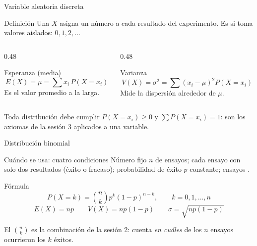 \documentclass[aspectratio=169,10pt]{beamer}
\begin{document}
\begin{frame}{Variable aleatoria discreta}
  \begin{block}{Definición}
    \small
    Una  $X$ asigna un número a cada resultado del
    experimento. Es  si toma valores aislados: $0,1,2,\dots$
  \end{block}

  \vspace{0.2cm}
  \begin{columns}[T,onlytextwidth]
    \begin{column}{0.48\textwidth}
      \begin{exampleblock}{Esperanza (media)}
        \[ E(X)=\mu=\sum x_i\,P(X=x_i) \]
        \footnotesize Es el valor promedio a la larga.
      \end{exampleblock}
    \end{column}
    \begin{column}{0.48\textwidth}
      \begin{exampleblock}{Varianza}
        \[ V(X)=\sigma^{2}=\sum (x_i-\mu)^{2}P(X=x_i) \]
        \footnotesize Mide la dispersión alrededor de $\mu$.
      \end{exampleblock}
    \end{column}
  \end{columns}

  \vspace{0.25cm}
  {\footnotesize\color{uniGris} Toda distribución debe cumplir
  $P(X=x_i)\ge 0$ y $\sum P(X=x_i)=1$: son los axiomas de la sesión 3
  aplicados a una variable.}
\end{frame}

\begin{frame}{Distribución binomial}
  \begin{block}{Cuándo se usa: cuatro condiciones}
    \footnotesize
    Número fijo $n$ de ensayos; cada ensayo con solo dos resultados (éxito o
    fracaso); probabilidad de éxito $p$ constante; ensayos
    .
  \end{block}

  \vspace{0.15cm}
  \begin{block}{Fórmula}
    \[ P(X=k)=\binom{n}{k}p^{k}(1-p)^{n-k},\qquad k=0,1,\dots,n \]
    \[ E(X)=np \qquad V(X)=np(1-p) \qquad \sigma=\sqrt{np(1-p)} \]
  \end{block}

  \vspace{0.1cm}
  {\scriptsize\color{uniGris} El $\binom{n}{k}$ es la combinación de la sesión
  2: cuenta \emph{en cuáles} de los $n$ ensayos ocurrieron los $k$ éxitos.}
\end{frame}
\end{document}
